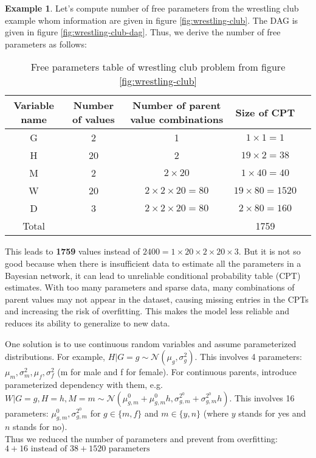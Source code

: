 \documentclass[12pt, a4paper]{article}
\theoremstyle{definition}
\newtheorem{example}{Example}[section]
\numberwithin{figure}{section}
\numberwithin{equation}{section}
\numberwithin{table}{section}
\begin{document}
\begin{example}
Let's compute number of free parameters from the wrestling club example whom information are given in figure \ref{fig:wrestling-club}. The DAG is given in figure \ref{fig:wrestling-club-dag}. Thus, we derive the number of free parameters as follows:

\begin{table}[ht]
\centering
\begin{tabular}{|c|c|c|c|c|}
\hline
Variable name & Number of values & \parbox{4cm}{Number of parent value combinations} & Size of CPT \\
\hline
G & 2 & 1 & $1\times1=1$ \\
\hline
H & 20 & 2 & $19\times2=38$ \\
\hline
M & 2 & $2\times20$ & $1\times40=40$ \\
\hline
W & 20 & $2\times2\times20=80$ & $19\times80=1520$ \\
\hline
D & 3 & $2\times2\times20=80$ & $2\times80=160$ \\
\hline
Total & & & 1759 \\
\hline
\end{tabular}
\caption{Free parameters table of wrestling club problem from figure \ref{fig:wrestling-club}}
\end{table}


This leads to \textbf{1759} values instead of $2400=1\times20\times2\times20\times3$. But it is not so good because when there is insufficient data to estimate all the parameters in a Bayesian network, it can lead to unreliable conditional probability table (CPT) estimates. With too many parameters and sparse data, many combinations of parent values may not appear in the dataset, causing missing entries in the CPTs and increasing the risk of overfitting. This makes the model less reliable and reduces its ability to generalize to new data.

One solution is to use continuous random variables and assume parameterized distributions.
For example, $H | G = g \sim \mathcal{N}(\mu_g, \sigma_g^2)$. This involves 4 parameters: $\mu_m, \sigma_m^2, \mu_f, \sigma_f^2$ (m for male and f for female).
For continuous parents, introduce parameterized dependency with them, e.g. $W | G = g, H = h, M = m \sim \mathcal{N}(\mu_{g,m}^0 + \mu_{g,m}^0 h, \sigma_{g,m}^{2^0} + \sigma_{g,m}^{2^0} h)$. This involves 16 parameters: $\mu_{g,m}^0, \sigma_{g,m}^{2^0}$ for $g \in \{m,f\}$ and $m \in \{y,n\}$ (where $y$ stands for yes and $n$ stands for no).\\

Thus we reduced the number of parameters and prevent from overfitting: $4 + 16 \text{ instead of } 38 + 1520 \text{ parameters}$

\end{example}
\end{document}
